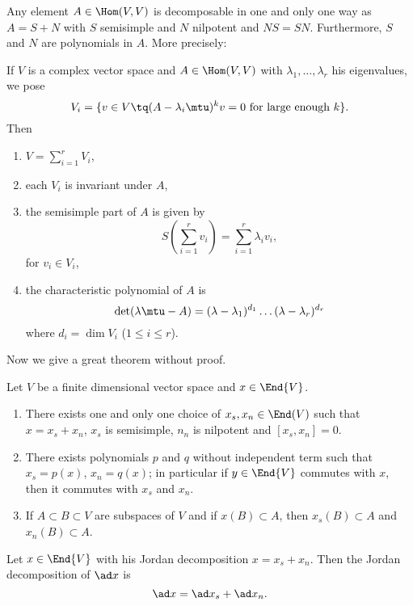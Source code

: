 \begin{theorem}
Any element $A\in\Hom(V,V)$ is decomposable in one and only one way as $A=S+N$ with $S$ semisimple and $N$ nilpotent and $NS=SN$. Furthermore, $S$ and $N$ are polynomials in $A$. More precisely:

If $V$ is a complex vector space and $A\in\Hom(V,V)$ with $\lambda_1,\ldots,\lambda_r$ his eigenvalues, we pose 
\[
V_i=\{ v\in V\tq (A-\lambda_i\mtu)^kv=0 \textrm{ for large enough $k$}\}.
\]
Then

\begin{enumerate}\label{tho:jordan}
\item $V=\sum_{i=1}^rV_i$,
\item each $V_i$ is invariant under $A$,
\item the semisimple part of $A$ is given by
\[
   S(\sum_{i=1}^rv_i)=\sum_{i=1}^r\lambda_iv_i,
\]
for $v_i\in V_i$,

\item the characteristic polynomial of $A$ is
\[
  \det(\lambda\mtu-A)=(\lambda-\lambda_1)^{d_1}\ldots(\lambda-\lambda_r)^{d_r}
\]
where $d_i=\dim V_i$ ($1\leq i\leq r$).
\end{enumerate}
\end{theorem}

Now we give a great theorem without proof.
\begin{theorem}
Let $V$ be a finite dimensional vector space and $x\in\End{V}$. 

\begin{enumerate}
\item There exists one and only one choice of $x_s,x_n\in\End(V)$ such that $x=x_s+x_n$, $x_s$ is semisimple, $n_n$ is nilpotent and $[x_s,x_n]=0$.

\item There exists polynomials $p$ and $q$ without independent term such that $x_s=p(x)$, $x_n=q(x)$; in particular if $y\in\End{V}$ commutes with $x$, then it commutes with $x_s$ and $x_n$.

\item If $A\subset B\subset V$ are subspaces of $V$ and if $x(B)\subset A$, then $x_s(B)\subset A$ and $x_n(B)\subset A$.
\end{enumerate}
\label{prop:Jordan_decomp}
\end{theorem}

\begin{lemma}\label{lem:Jordan_ad}
    Let $x\in\End{V}$ with his Jordan decomposition $x=x_s+x_n$. Then the Jordan decomposition of $\ad x$ is
    \begin{equation}\label{eq:ad_x_xs_xn}
       \ad x=\ad x_s+\ad x_n.
    \end{equation}
\end{lemma}

